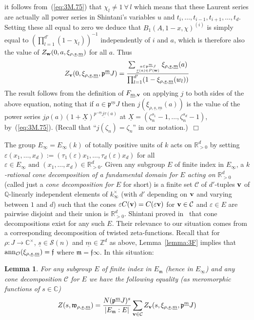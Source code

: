 \documentclass[12pt]{article}
\newtheorem{lemma}{Lemma}[section]
\newcounter{rem}[section]%
\newcommand{\bbC}{\ensuremath{\mathbb{C}}}
\newcommand{\bbQ}{\ensuremath{\mathbb{Q}}}
\newcommand{\bbR}{\ensuremath{\mathbb{R}}}
\newcommand{\bbZ}{\ensuremath{\mathbb{Z}}}
\newcommand{\bv}{\ensuremath{{\bf v}}}
\newcommand{\bw}{\ensuremath{{\bf w}}}
\newcommand{\cC}{\ensuremath{\mathcal{C}}}
\newcommand{\cO}{\ensuremath{\mathcal{O}}}
\newcommand{\cS}{\ensuremath{\mathcal{S}}}
\newcommand{\ePf}{\hspace*{\fill}~$\Box$\vertsp\par}%
\newcommand{\ff}{\ensuremath{\mathfrak{f}}}
\newcommand{\fm}{\ensuremath{\mathfrak{m}}}
\newcommand{\fp}{\ensuremath{\mathfrak{p}}}
\newcommand{\fw}{\ensuremath{\mathfrak{w}}}
\newcommand{\inv}{^{-1}}%
\newcommand{\refeq}[1]{~(\ref{eq:#1})}
\newcommand{\rem}{\refstepcounter{rem}\noindent{\sc Remark \therem}}%
\renewcommand{\therem}{\thesection.\arabic{rem}}
\newcommand{\vertsp}{\vspace{1ex}}
\newcommand{\uinf}{\ensuremath{{\underline{\infty}}}}
\newcommand{\ujct}{\ensuremath{\underline{j\tau}}}
\newcommand{\um}{\ensuremath{{\underline{m}}}}
\newcommand{\us}{\ensuremath{{\underline{s}}}}
\newcommand{\utau}{\ensuremath{{\underline{\tau}}}}
\newcommand{\uX}{\ensuremath{{\underline{X}}}}
\begin{document}
it follows from\refeq{3M.75} that $\chi_l\neq 1\ \forall\,l$
which means that these Laurent series are actually all power series
in Shintani's variables $u$ and $t_i,\ldots,t_{i-1},t_{i+1},\ldots,t_d$. Setting these
all equal to zero we deduce that $B_1(A,1-x,\chi)^{(i)}$ is simply equal to
$(\prod_{l=1}^{d'}(1-\chi_l))\inv$ independently of $i$ and $a$,
which is therefore also the value of $Z_{\bw}(0,a,\xi_{\rho,\us,\um})$ for all $a$. Thus
\[
Z_{\bv}(0,\xi_{\rho,\us,\um},\fp^\um J)=
\frac
{ \sum_{a\in\fp^{\um} J\atop \utau(a)\in P(\bw)}
\xi_{\rho,\us,\um}(a)}
{ \prod_{l=1}^{d'}
(1-\xi_{\rho,\us,\um}(w_l))}
\]
The result follows from the definition of $F_{\um,\bv}$ on applying $j$ to both sides
of the above equation, noting that if $a\in\fp^\um J$ then
$j(\xi_{\rho,\us,\um}(a))$ is the value of the power series
$j\rho(a)(1+\uX)^{p^{-\um}\ujct(a)}$ at $\uX=(\zeta_n^{s_1}-1,\ldots,\zeta_n^{s_d}-1)$,
by\refeq{3M.75}.
(Recall that ``$j(\zeta_n)=\zeta_n$'' in our notation.)\ePf
\noindent
The group $E_\uinf=E_\uinf(k)$ of totally positive units of $k$
acts on $\bbR^d_{>0}$ by setting
$\varepsilon (x_1,\ldots,x_d):=(\tau_1(\varepsilon)x_1,\ldots,\tau_d(\varepsilon)x_d)$
for all $\varepsilon\in E_\uinf\mbox{\ and \ }(x_1,\ldots,x_d)\in\bbR^d_{>0}$.
Given any subgroup
$E$ of finite index in $E_\uinf$, a
\emph{$k$-rational cone decomposition
of a fundamental domain for $E$ acting on $\bbR_{>0}^d$}
(called just a \emph{cone decomposition for $E$} for short) is a finite
set $\cC$ of $d'$-tuples $\bv$ of $\bbQ$-linearly independent
elements of $k^\times_{\uinf}$ (with $d'$ depending on
$\bv$ and varying between $1$ and $d$) such that the cones
$\varepsilon C(\bv)=C(\varepsilon \bv)$ for $\bv\in\cC$ and $\varepsilon\in E$
are pairwise disjoint and their union is
$\bbR_{>0}^d$. Shintani proved in~\cite{Shi} that
cone decompositions exist for any such $E$. Their relevance to our
situation comes from a corresponding decomposition of
twisted zeta-functions. Recall that for $\rho:J\rightarrow \bbC^\times$, $\us\in\cS(n)$ and
$\um\in\bbZ^d$ as above,
Lemma~\ref{lemma:3F} implies that ${\rm ann}_\cO(\xi_{\rho,\us,\um})=\ff$
where $\fm=\ff\infty$. In this situation:
\begin{lemma}\label{lemma:3K}
For any subgroup $E$ of finite index in $E_\fm$
(hence in $E_\uinf$) and any cone decomposition $\cC$ for $E$ we have
the following equality (as meromorphic functions of $s\in\bbC$)
\[
Z(s,\fw_{\rho,\us,\um})=
\frac{N(\fp^\um J)^s}{|E_\fm:E|}\sum_{\bv\in\cC}Z_{\bv}(s,\xi_{\rho,\us,\um},\fp^\um J)
\]
\end{lemma}
\end{document}
